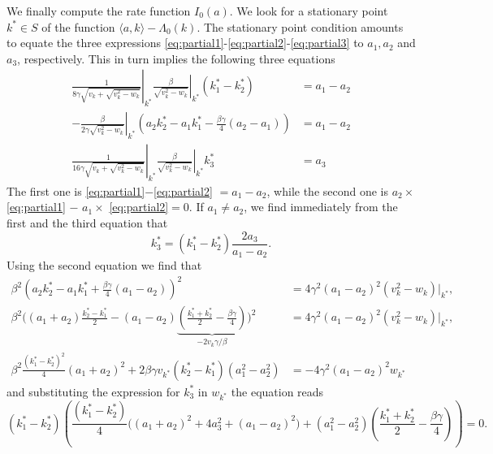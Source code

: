 \documentclass[a4paper,11pt]{article}
\numberwithin{equation}{section}
\begin{document}
We finally compute the rate function $I_0(a)$. We look for a stationary point $k^* \in S$ of the function $\langle a, k \rangle - \Lambda_0(k)$. The stationary point condition amounts to equate the three expressions \eqref{eq:partial1}-\eqref{eq:partial2}-\eqref{eq:partial3} to $a_1,a_2$ and $a_3$, respectively. This in turn implies the following three equations
\begin{align}
    \left.\frac{1}{8\gamma \sqrt{  v_k + \sqrt{v_k^2 - w_k}} }\right\vert_{k^*} \left. \frac{\beta}{\sqrt{v_k^2 - w_k}}\right\vert_{k^*} (k^*_1 - k^*_2) &= a_1 -a_2 \label{eq:firsteq}\\
     - \left.\frac{\beta}{2\gamma\sqrt{v_k^2 - w_k}}\right\vert_{k^*}\left( a_2 k_2^* - a_1 k_1^* - \frac{\beta\gamma}{4}(a_2 - a_1) \right) &= a_1 - a_2 \label{eq:secondeq}\\
     \left.\frac{1}{16\gamma \sqrt{  v_k + \sqrt{v_k^2 - w_k}} }\right\vert_{k^*} \left. \frac{\beta}{\sqrt{v_k^2 - w_k}}\right\vert_{k^*} k_3^* &= a_3
\end{align}
The first one is \eqref{eq:partial1}$-$\eqref{eq:partial2} $=a_1 - a_2$, while the second one is $a_2\times$ \eqref{eq:partial1} $-$ $a_1\times$ \eqref{eq:partial2}$=0$. If $a_1 \neq a_2$, we find immediately from the first and the third equation that
\begin{equation}\label{eq:k3intermediate}
    k_3^* = (k_1^*-k_2^*) \frac{2a_3}{a_1-a_2}.
\end{equation}
Using the second equation we find that
\begin{align}
    \beta^2 \left( a_2 k_2^* - a_1 k_1^* + \frac{\beta\gamma}{4}(a_1 - a_2) \right)^2 &= 4\gamma^2 (a_1-a_2)^2 \left( v_k^2 - w_k \right) \Big\vert_{k^*}, \nonumber\\
    \beta^2 \Bigg( (a_1+a_2) \frac{k_2^*-k_1^*}{2} - (a_1-a_2)\underbrace{\left(\frac{k_1^* +k_2^*}{2}  - \frac{\beta\gamma}{4}\right)}_{-2 v_k \gamma/\beta} \Bigg)^2 &= 4\gamma^2 (a_1-a_2)^2 \left( v_k^2 - w_k \right) \Big\vert_{k^*}, \nonumber \\
    \beta^2 \frac{(k_1^*-k_2^*)^2}{4}(a_1+a_2)^2 + 2 \beta\gamma v_{k^*} (k_2^*-k_1^*)(a_1^2-a_2^2) &= - 4\gamma^2 (a_1-a_2)^2 w_{k^*}
\end{align}
and substituting the expression for $k_3^*$ in $w_{k^*}$ the equation reads
\begin{equation*}
    (k_1^*-k_2^*)\left(  \frac{(k_1^*-k_2^*)}{4} \Big((a_1+a_2)^2 + 4a_3^2 + (a_1-a_2)^2\Big) +  (a_1^2-a_2^2)\left(\frac{k_1^* +k_2^*}{2}  - \frac{\beta\gamma}{4}\right)  \right)= 0.
\end{equation*}
\end{document}
